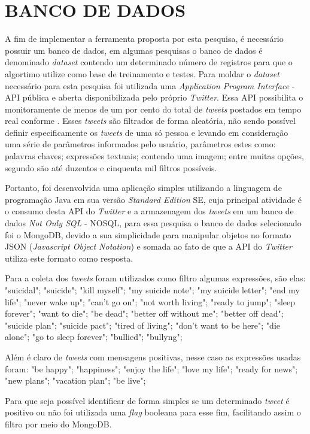 \chapter{BANCO DE DADOS}

A fim de implementar a ferramenta proposta por esta pesquisa, é necessário possuir um banco de dados, em algumas pesquisas o banco de dados é denominado \textit{dataset} contendo um determinado número de registros para que o algortimo utilize como base de treinamento e testes. Para moldar o \textit{dataset} necessário para esta pesquisa foi utilizada uma \textit{Application Program Interface} - API pública e aberta disponibilizada pelo próprio \textit{Twitter}. Essa API possibilita o monitoramente de menos de um por cento do total de \textit{tweets} postados em tempo real conforme \cite{natural_language_processing_mental_health}. Esses \textit{tweets} são filtrados de forma aleatória, não sendo possível definir especificamente os \textit{tweets} de uma só pessoa e levando em consideração uma série de parâmetros informados pelo usuário, parâmetros estes como: palavras chaves; expressões textuais; contendo uma imagem; entre muitas opções, segundo  são até duzentos e cinquenta mil filtros possíveis.

Portanto, foi desenvolvida uma aplicação simples utilizando a linguagem de programação Java em sua versão \textit{Standard Edition} SE, cuja principal atividade é o consumo desta API do \textit{Twitter} e a armazenagem dos \textit{tweets} em um banco de dados \textit{Not Only SQL} - NOSQL, para essa pesquisa o banco de dados selecionado foi o MongoDB, devido a sua simplicidade para manipular objetos no formato JSON (\textit{Javascript Object Notation}) e somada ao fato de que a API do \textit{Twitter} utiliza este formato como resposta.

Para a coleta dos \textit{tweets} foram utilizados como filtro algumas expressões, são elas:
\newline
"suicidal"; "suicide"; "kill myself"; "my suicide note"; "my suicide letter"; "end my life"; "never wake up"; "can't go on";
"not worth living"; "ready to jump"; "sleep forever"; "want to die"; "be dead"; "better off without me"; "better off dead"; "suicide plan"; "suicide pact"; "tired of living"; "don't want to be here"; "die alone"; "go to sleep forever"; "bullied"; "bullyng";

Além é claro de \textit{tweets} com mensagens positivas, nesse caso as expressões usadas foram:
\newline
"be happy"; "happiness"; "enjoy the life"; "love my life"; "ready for news"; "new plans"; "vacation plan"; "be live";

Para que seja possível identificar de forma simples se um determinado \textit{tweet} é positivo ou não foi utilizada uma \textit{flag} booleana para esse fim, facilitando assim o filtro por meio do MongoDB.